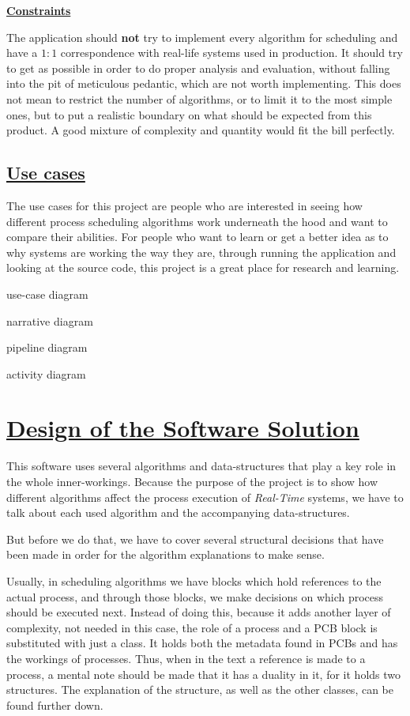 \documentclass{article}
\newcommand{\code}[1]{\codeinline{\texttt{#1}}}
\begin{document}
\underline{\textbf{Constraints}}

The application should \textbf{not} try to implement every algorithm for scheduling and have a \(1:1\) correspondence with real-life systems used in production. It should try to get as possible in order to do proper analysis and evaluation, without falling into the pit of meticulous pedantic, which are not worth implementing. This does not mean to restrict the number of algorithms, or to limit it to the most simple ones, but to put a realistic boundary on what should be expected from this product. A good mixture of complexity and quantity would fit the bill perfectly.

\subsection{\underline{Use cases}}

The use cases for this project are people who are interested in seeing how different process scheduling algorithms work underneath the hood and want to compare their abilities. For people who want to learn or get a better idea as to why systems are working the way they are, through running the application and looking at the source code, this project is a great place for research and learning.

use-case diagram

narrative diagram

pipeline diagram

activity diagram

\section{\underline{Design of the Software Solution}}

This software uses several algorithms and data-structures that play a key role in the whole inner-workings. Because the purpose of the project is to show how different algorithms affect the process execution of \textit{Real-Time} systems, we have to talk about each used algorithm and the accompanying data-structures.

But before we do that, we have to cover several structural decisions that have been made in order for the algorithm explanations to make sense.

Usually, in scheduling algorithms we have \code{PCB} blocks which hold references to the actual process, and through those blocks, we make decisions on which process should be executed next. Instead of doing this, because it adds another layer of complexity, not needed in this case, the role of a process and a PCB block is substituted with just a \code{process} class. It holds both the metadata found in PCBs and has the workings of processes. Thus, when in the text a reference is made to a process, a mental note should be made that it has a duality in it, for it holds two structures. The explanation of the \code{process} structure, as well as the other classes, can be found further down.
\end{document}
